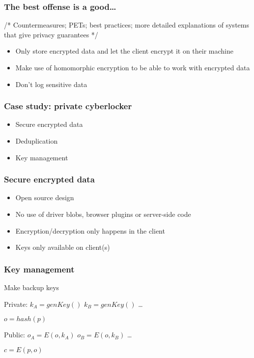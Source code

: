 \documentclass{beamer}
\begin{document}
\begin{frame}
    \frametitle{The best offense is a good\dots}
    /* Countermeasures; PETs; best practices; more detailed explanations of
    systems that give privacy guarantees */
    \begin{itemize}
      \item Only store encrypted data and let the client encrypt it on their machine
      \item Make use of homomorphic encryption to be able to work with encrypted data
      \item Don't log sensitive data
    \end{itemize}
\end{frame}

\begin{frame}
    \frametitle{Case study: private cyberlocker}
    \begin{itemize}
    \item Secure encrypted data
    \item Deduplication
    \item Key management
    \end{itemize}
\end{frame}

\begin{frame}
    \frametitle{Secure encrypted data}
    \begin{itemize}
    \item Open source design
    \item No use of driver blobs, browser plugins or server-side code
    \item Encryption/decryption only happens in the client
    \item Keys only available on client(s)
    \end{itemize}
\end{frame}


\begin{frame}
    \frametitle{Key management}
    Make backup keys

    Private:
    $k_A = genKey()$
    $k_B = genKey()$
    \dots

    $o = hash(p)$

    Public:
    $o_A = E(o, k_A)$
    $o_B = E(o, k_B)$
    \dots

    $c = E(p,o)$
\end{frame}
\end{document}

